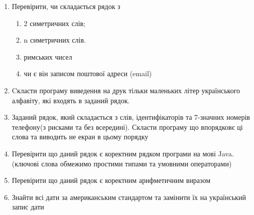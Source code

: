\documentclass[]{article}
\makeatletter
\newcommand{\xslalph}[1]{\expandafter\@xslalph\csname c@#1\endcsname}
\newcommand{\@xslalph}[1]{%
    \ifcase#1\or а\or б\or в\or г\or д\or e\or є\or ж\or з\or i%
    \or й\or к\or л\or м\or н\or о\or п\or р\or с\or т%
    \or у\or ф\or х\or ц\or ч\or ш\or ю\or я\or аа\or бб\or вв %
    \else\@ctrerr\fi%
}
\makeatother
\begin{document}
\begin{enumerate}
\item  
Перевірити, чи складається рядок з
\begin{enumerate}[label=\xslalph*)]
\item 2 симетричних слів;
\item n симетричних слів.
\item римських чисел
\item чи є він записом поштової адреси (email)
\end{enumerate}

\item   Cкласти  програму виведення на друк тільки маленьких літер українського алфавіту, які входять в заданий рядок.

\item  Заданий рядок, який складається з слів, ідентифікаторів та 7-значних номерів телефону(з рисками та без всередині). Скласти  програму що впорядковє ці слова та виводить не екран в цьому порядку

\item   Перевірити що даний рядок є коректним рядком програми на мові Java. (ключові слова обмежимо простими типами та умовними операторами)

\item   Перевірити що даний рядок є коректним арифметичним виразом

\item   Знайти всі дати за американським стандартом та замінити їх на український запис дати
\end{enumerate}
\end{document}
